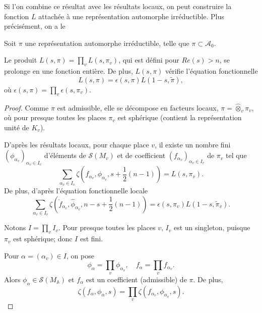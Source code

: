 Si l'on combine ce résultat avec les résultats locaux, on peut construire la fonction $L$ attachée à une représentation automorphe irréductible. Plus précisément, on a le
\begin{theoreme}
Soit $\pi$ une représentation automorphe irréductible, telle que $\pi \subset \mathcal{A}_0$.

Le produit $L(s, \pi) = \prod_v L(s, \pi_v)$, qui est défini pour $Re(s) > n$, se prolonge en une fonction entière. De plus, $L(s, \pi)$ vérifie l'équation fonctionnelle
\begin{equation}
L(s,\pi) = \epsilon(s,\pi)L(1-s,\tilde{\pi}),
\end{equation}
où $\epsilon(s,\pi) = \prod_v \epsilon(s, \pi_v)$.
\end{theoreme}

\begin{proof}
Comme $\pi$ est admissible, elle se décompose en facteurs locaux,
$\pi = \hat{\otimes}_v \pi_v$, où pour presque toutes les places $\pi_v$ est sphérique (contient la représentation unité de $K_v$).

D'après les résultats locaux, pour chaque place $v$, il existe un nombre fini $(\phi_{\alpha_v})_{\alpha_v \in I_v}$ d'éléments de $\mathcal{S}(M_v)$ et de coefficient $(f_{\alpha_v})_{\alpha_v \in I_v}$ de $\pi_v$ tel que
\begin{equation}
\sum_{\alpha_v \in I_v} \zeta(f_{\alpha_v}, \phi_{\alpha_v}, s + \frac{1}{2}(n-1)) = L(s, \pi_v).
\end{equation}
De plus, d'après l'équation fonctionnelle locale
\begin{equation}
\sum_{\alpha_v \in I_v} \zeta(\check{f}_{\alpha_v}, \hat{\phi}_{\alpha_v}, n-s + \frac{1}{2}(n-1)) = \epsilon(s,\pi_v)L(1-s, \tilde{\pi}_v).
\end{equation}

Notons $I = \prod_v I_v$. Pour presque toutes les places $v$, $I_v$ est un singleton, puisque $\pi_v$ est sphérique; donc $I$ est fini.

Pour $\alpha = (\alpha_v) \in I$, on pose
\begin{equation}
\phi_\alpha = \prod_v \phi_{\alpha_v}, \quad f_\alpha = \prod_v f_{\alpha_v}.
\end{equation}
Alors $\phi_\alpha \in \mathcal{S}(M_\mathbb{A})$ et $f_\alpha$ est un coefficient (admissible) de $\pi$. De plus,
\begin{equation}
\zeta(f_\alpha, \phi_\alpha, s) = \prod_v \zeta(f_{\alpha_v}, \phi_{\alpha_v}, s).
\end{equation}


\end{proof}
